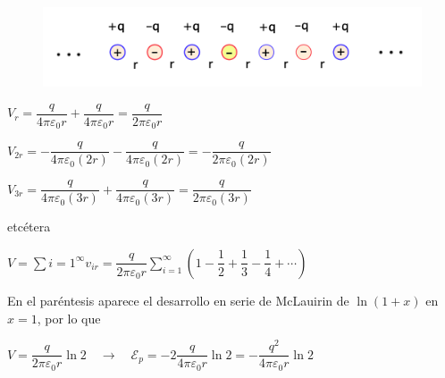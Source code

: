 \begin{figure}[H]
	\centering
	\includegraphics[width=1\textwidth]{imagenes/imagenes23/T23IM16.png}
\end{figure}

$V_r=\dfrac {q}{4\pi \varepsilon_0 r}+\dfrac {q}{4\pi \varepsilon_0 r}=\dfrac {q}{2\pi \varepsilon_0 r}$

$V_{2r}=-\dfrac {q}{4\pi \varepsilon_0 (2r)}-\dfrac {q}{4\pi \varepsilon_0 (2r)}=-\dfrac {q}{2\pi \varepsilon_0 (2r)}$

$V_{3r}=\dfrac {q}{4\pi \varepsilon_0 (3r)}+\dfrac {q}{4\pi \varepsilon_0 (3r)}=\dfrac {q}{2\pi \varepsilon_0 (3r)}$

etcétera

$V=\displaystyle \sum{i=1}^\infty v_{ir}=\dfrac {q}{2\pi \varepsilon_0 r}\sum_{i=1}^\infty
\left( 1-\dfrac 1 2 + \dfrac 1 3 - \dfrac 1 4 + \cdots \right)$

En el paréntesis aparece el desarrollo en serie de McLauirin de $\ln(1+x)$ en $x=1$, por lo que

$V=\dfrac {q}{2\pi \varepsilon_0 r} \ln 2 \quad \to \quad \mathcal E_p=-2 \dfrac {q}{4\pi \varepsilon_0 r} \ln 2 = - \dfrac {q^2}{4\pi \varepsilon_0 r}\ln 2$

